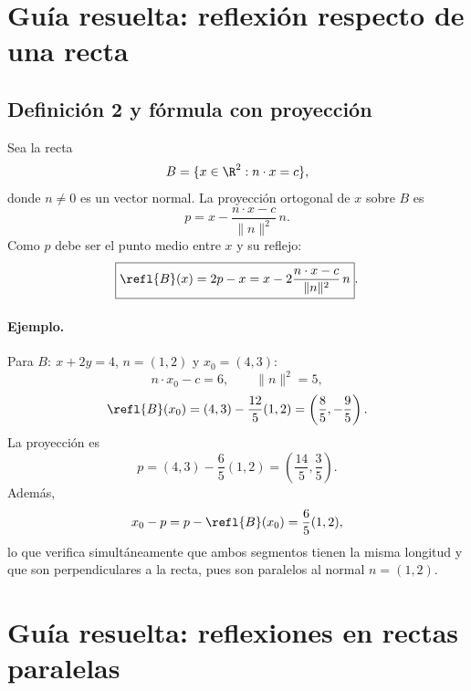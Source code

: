 \section{Guía resuelta: reflexión respecto de una recta}

\subsection{Definición 2 y fórmula con proyección}

Sea la recta
\[
  B=\{x\in\R^2:n\cdot x=c\},
\]
donde \(n\neq0\) es un vector normal. La proyección ortogonal de \(x\) sobre \(B\) es
\[
  p=x-\frac{n\cdot x-c}{\lVert n\rVert^2}\,n.
\]
Como \(p\) debe ser el punto medio entre \(x\) y su reflejo:
\[
  \boxed{\refl{B}(x)=2p-x
  =x-2\frac{n\cdot x-c}{\lVert n\rVert^2}\,n}.
\]

\begin{center}
\end{center}

\paragraph{Ejemplo.}
Para \(B:\ x+2y=4\), \(n=(1,2)\) y \(x_0=(4,3)\):
\[
  n\cdot x_0-c=6,\qquad \lVert n\rVert^2=5,
\]
\[
  \refl{B}(x_0)
  =(4,3)-\frac{12}{5}(1,2)
  =\left(\frac85,-\frac95\right).
\]
La proyección es
\[
  p=(4,3)-\frac65(1,2)
  =\left(\frac{14}{5},\frac35\right).
\]
Además,
\[
  x_0-p=p-\refl{B}(x_0)=\frac65(1,2),
\]
lo que verifica simultáneamente que ambos segmentos tienen la misma longitud y que son
perpendiculares a la recta, pues son paralelos al normal \(n=(1,2)\).

\section{Guía resuelta: reflexiones en rectas paralelas}

